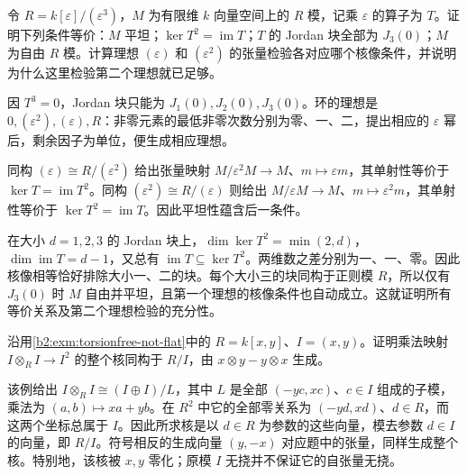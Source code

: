 \begin{exercise}\label{b2:ex:07-dual-numbers-flat}
	令 \(R=k[\varepsilon]/(\varepsilon^3)\)，\(M\) 为有限维 \(k\) 向量空间上的 \(R\) 模，记乘 \(\varepsilon\) 的算子为 \(T\)。证明下列条件等价：\(M\) 平坦；\(\ker T^2=\operatorname{im}T\)；\(T\) 的 Jordan 块全部为 \(J_3(0)\)；\(M\) 为自由 \(R\) 模。计算理想 \((\varepsilon)\) 和 \((\varepsilon^2)\) 的张量检验各对应哪个核像条件，并说明为什么这里检验第二个理想就已足够。
\end{exercise}
\begin{solution}
	因 \(T^3=0\)，Jordan 块只能为 \(J_1(0),J_2(0),J_3(0)\)。环的理想是 \(0,(\varepsilon^2),(\varepsilon),R\)：非零元素的最低非零次数分别为零、一、二，提出相应的 \(\varepsilon\) 幂后，剩余因子为单位，便生成相应理想。

	同构 \((\varepsilon)\cong R/(\varepsilon^2)\) 给出张量映射 \(M/\varepsilon^2M\to M\)、\(m\mapsto\varepsilon m\)，其单射性等价于 \(\ker T=\operatorname{im}T^2\)。同构 \((\varepsilon^2)\cong R/(\varepsilon)\) 则给出 \(M/\varepsilon M\to M\)、\(m\mapsto\varepsilon^2m\)，其单射性等价于 \(\ker T^2=\operatorname{im}T\)。因此平坦性蕴含后一条件。

	在大小 \(d=1,2,3\) 的 Jordan 块上，\(\dim\ker T^2=\min(2,d)\)，\(\dim\operatorname{im}T=d-1\)，又总有 \(\operatorname{im}T\subseteq\ker T^2\)。两维数之差分别为一、一、零。因此核像相等恰好排除大小一、二的块。每个大小三的块同构于正则模 \(R\)，所以仅有 \(J_3(0)\) 时 \(M\) 自由并平坦，且第一个理想的核像条件也自动成立。这就证明所有等价关系及第二个理想检验的充分性。
\end{solution}

\begin{exercise}\label{b2:ex:07-ideal-tensor-kernel}
	沿用\cref{b2:exm:torsionfree-not-flat}中的 \(R=k[x,y]\)、\(I=(x,y)\)。证明乘法映射 \(I\otimes_R I\to I^2\) 的整个核同构于 \(R/I\)，由 \(x\otimes y-y\otimes x\) 生成。
\end{exercise}
\begin{solution}
	该例给出 \(I\otimes_R I\cong(I\oplus I)/L\)，其中 \(L\) 是全部 \((-yc,xc)\)、\(c\in I\) 组成的子模，乘法为 \((a,b)\mapsto xa+yb\)。在 \(R^2\) 中它的全部零关系为 \((-yd,xd)\)、\(d\in R\)，而这两个坐标总属于 \(I\)。因此所求核是以 \(d\in R\) 为参数的这些向量，模去参数 \(d\in I\) 的向量，即 \(R/I\)。符号相反的生成向量 \((y,-x)\) 对应题中的张量，同样生成整个核。特别地，该核被 \(x,y\) 零化；原模 \(I\) 无挠并不保证它的自张量无挠。
\end{solution}

